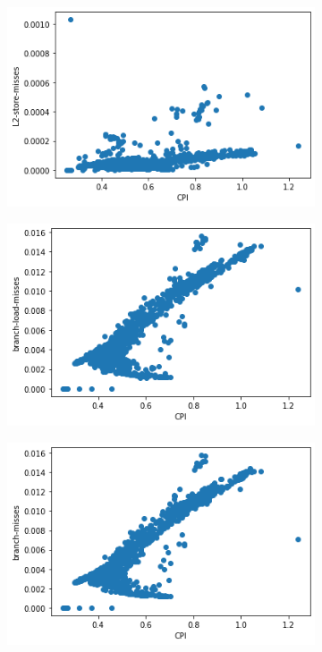 \documentclass[10pt, letterpaper, IEEEtran, tikz,border=5,a4paper,fleqn]{article}
\begin{document}
\begin{figure}
\begin{subfigure}{.33\textwidth}
\end{subfigure}

\begin{subfigure}{.33\textwidth}
  \centering
  \includegraphics[width=.9\linewidth]{L2-store-misses.png}

\end{subfigure}%
\begin{subfigure}{.33\textwidth}
  \centering
  \includegraphics[width=.9\linewidth]{branch-load-misses.png}

\end{subfigure}%
\begin{subfigure}{.33\textwidth}
  \centering
  \includegraphics[width=.9\linewidth]{branch-misses.png}


\end{subfigure}
\end{figure}
\end{document}
